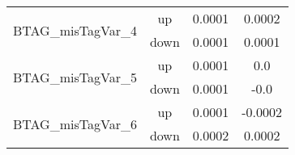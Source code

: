 \begin{table}[h!]
\begin{tabular}{lccc}
\multirow{2}{*}{BTAG\_misTagVar\_4}      & up   &       0.0001     &     0.0002      \\
                                       & down &         0.0001     &     0.0001       \\ \hline
\multirow{2}{*}{BTAG\_misTagVar\_5}      & up   &        0.0001     &     0.0      \\
                                       & down &        0.0001     &     -0.0       \\ \hline
\multirow{2}{*}{BTAG\_misTagVar\_6}      & up   &        0.0001     &     -0.0002      \\
                                       & down &         0.0002     &     0.0002       \\ \hline
\hline\hline
\end{tabular}
\end{table}


